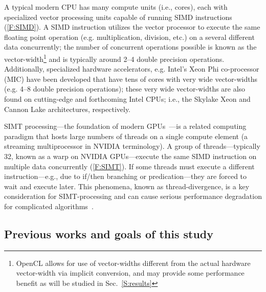 \documentclass[12pt,number,sort&compress,preprint]{elsarticle}
\begin{document}
A typical modern CPU has many compute units (i.e., cores), each with specialized vector processing units capable of running SIMD instructions (\cref{F:SIMD}).
A SIMD instruction utilizes the vector processor to execute the same floating point operation (e.g. multiplication, division, etc.) on a several different data concurrently; the number of concurrent operations possible is known as the vector-width\footnote{OpenCL allows for use of vector-widths different from the actual hardware vector-width via implicit conversion, and may provide some performance benefit as will be studied in Sec.~\ref{S:results}} and is typically around 2--4 double precision operations. 
Additionally, specialized hardware accelerators, e.g. Intel's Xeon Phi co-processor (MIC) have been developed that have tens of cores with very wide vector-widths (e.g. 4--8 double precision operations); these very wide vector-widths are also found on cutting-edge and forthcoming Intel CPUs; i.e., the Skylake Xeon and Cannon Lake architectures, respectively.

SIMT processing---the foundation of modern GPUs~\cite{lindholm2008nvidia}---is a related computing paradigm that hosts large numbers of threads on a single compute element (a streaming multiprocessor in NVIDIA terminology).
A group of threads---typically \num{32}, known as a warp on NVIDIA GPUs---execute the same SIMD instruction on multiple data concurrently (\cref{F:SIMT}).
If some threads must execute a different instruction---e.g., due to if\slash then branching or predication---they are forced to wait and execute later.
This phenomena, known as thread-divergence, is a key consideration for SIMT-processing and can cause serious performance degradation for complicated algorithms~\cite{CurtisGPU:2017}.

\subsection{Previous works and goals of this study}
\end{document}
